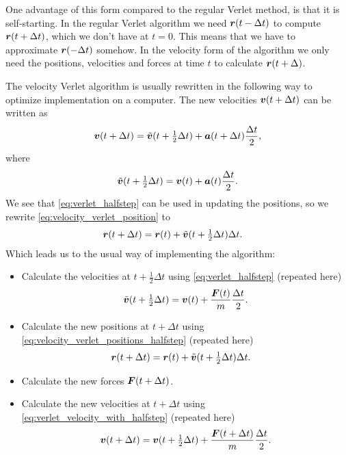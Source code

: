 One advantage of this form compared to the regular Verlet method, is that it is self-starting. In the regular Verlet algorithm we need $\boldsymbol{r}(t-\Delta t)$ to compute $\boldsymbol{r}(t+\Delta t)$, which we don't have at $t = 0$. This means that we have to approximate $\boldsymbol{r}(-\Delta t)$ somehow. In the velocity form of the algorithm we only need the positions, velocities and forces at time $t$ to calculate $\boldsymbol{r}(t+\Delta)$.


The velocity Verlet algorithm is usually rewritten in the following way to optimize implementation on a computer. The new velocities $\boldsymbol{v}(t+\Delta t)$ can be written as
\begin{align}
    \boldsymbol{v}(t+\Delta t) = \tilde{\boldsymbol{v}}(t + \tfrac{1}{2}\Delta t) + \boldsymbol{a}(t+\Delta t)\frac{\Delta t}{2}, \label{eq:verlet_velocity_with_halfstep}
\end{align}
where
\begin{align}
    \tilde{\boldsymbol{v}}(t + \tfrac{1}{2}\Delta t) = \boldsymbol{v}(t) + \boldsymbol{a}(t)\frac{\Delta t}{2}.\label{eq:verlet_halfstep}
\end{align}
We see that \cref{eq:verlet_halfstep} can be used in updating the positions, so we rewrite \cref{eq:velocity_verlet_position} to
\begin{align}
    \boldsymbol{r}(t + \Delta t) &= \boldsymbol{r}(t) + \tilde{\boldsymbol{v}}(t+\tfrac{1}{2}\Delta t)\Delta t.\label{eq:velocity_verlet_positions_halfstep}
\end{align}
Which leads us to the usual way of implementing the algorithm\cite{allen1989computer}:
\begin{itemize}
    \item Calculate the velocities at $t+\tfrac{1}{2}\Delta t$ using \cref{eq:verlet_halfstep} (repeated here)
    \begin{align*}
        \tilde{\boldsymbol{v}}(t + \tfrac{1}{2}\Delta t) = \boldsymbol{v}(t) + \frac{\boldsymbol{F}(t)}{m}\frac{\Delta t}{2}.
    \end{align*}
    \item Calculate the new positions at $t + \Delta t$ using \cref{eq:velocity_verlet_positions_halfstep} (repeated here)
    \begin{align*}
        \boldsymbol{r}(t + \Delta t) &= \boldsymbol{r}(t) + \tilde{\boldsymbol{v}}(t+\tfrac{1}{2}\Delta t)\Delta t.
    \end{align*}
    \item Calculate the new forces $\boldsymbol{F}(t+\Delta t)$.%
    \item Calculate the new velocities at $t+\Delta t$ using \cref{eq:verlet_velocity_with_halfstep} (repeated here)
    \begin{align*}
        \boldsymbol{v}(t+\Delta t) = \boldsymbol{v}(t + \tfrac{1}{2}\Delta t) + \frac{\boldsymbol{F}(t + \Delta t)}{m}\frac{\Delta t}{2}.
    \end{align*}
\end{itemize}
